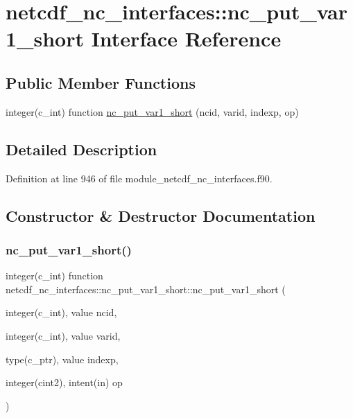 \hypertarget{interfacenetcdf__nc__interfaces_1_1nc__put__var1__short}{}\section{netcdf\+\_\+nc\+\_\+interfaces\+:\+:nc\+\_\+put\+\_\+var1\+\_\+short Interface Reference}
\label{interfacenetcdf__nc__interfaces_1_1nc__put__var1__short}
\subsection*{Public Member Functions}
\begin{DoxyCompactItemize}
\item 
integer(c\+\_\+int) function \hyperlink{interfacenetcdf__nc__interfaces_1_1nc__put__var1__short_a1e914636ea7f6d09529680450889c3d0}{nc\+\_\+put\+\_\+var1\+\_\+short} (ncid, varid, indexp, op)
\end{DoxyCompactItemize}


\subsection{Detailed Description}


Definition at line 946 of file module\+\_\+netcdf\+\_\+nc\+\_\+interfaces.\+f90.



\subsection{Constructor \& Destructor Documentation}
\mbox{\label{interfacenetcdf__nc__interfaces_1_1nc__put__var1__short_a1e914636ea7f6d09529680450889c3d0}} 
\subsubsection{\texorpdfstring{nc\+\_\+put\+\_\+var1\+\_\+short()}{nc\_put\_var1\_short()}}
{\footnotesize\ttfamily integer(c\+\_\+int) function netcdf\+\_\+nc\+\_\+interfaces\+::nc\+\_\+put\+\_\+var1\+\_\+short\+::nc\+\_\+put\+\_\+var1\+\_\+short (\begin{DoxyParamCaption}\item[{integer(c\+\_\+int), value}]{ncid,  }\item[{integer(c\+\_\+int), value}]{varid,  }\item[{type(c\+\_\+ptr), value}]{indexp,  }\item[{integer(cint2), intent(in)}]{op }\end{DoxyParamCaption})}



